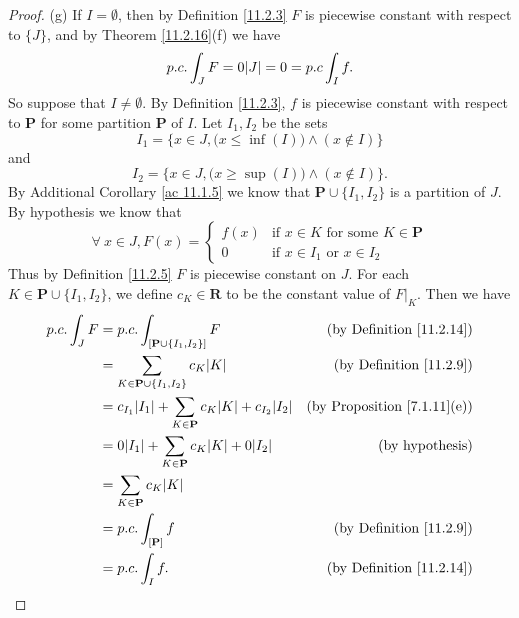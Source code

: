 \begin{proof}{(g)}
    If \(I = \emptyset\), then by Definition \ref{11.2.3} \(F\) is piecewise constant with respect to \(\{J\}\), and by Theorem \ref{11.2.16}(f) we have
    \[
        p.c. \int_J F = 0 \abs*{J} = 0 = p.c \int_I f.
    \]
    So suppose that \(I \neq \emptyset\).
    By Definition \ref{11.2.3}, \(f\) is piecewise constant with respect to \(\mathbf{P}\) for some partition \(\mathbf{P}\) of \(I\).
    Let \(I_1, I_2\) be the sets
    \[
        I_1 = \Big\{x \in J, \big(x \leq \inf(I)\big) \land (x \notin I)\Big\}
    \]
    and
    \[
        I_2 = \Big\{x \in J, \big(x \geq \sup(I)\big) \land (x \notin I)\Big\}.
    \]
    By Additional Corollary \ref{ac 11.1.5} we know that \(\mathbf{P} \cup \{I_1, I_2\}\) is a partition of \(J\).
    By hypothesis we know that
    \[
        \forall\ x \in J, F(x) = \begin{cases}
            f(x) & \text{if } x \in K \text{ for some } K \in \mathbf{P} \\
            0    & \text{if } x \in I_1 \text{ or } x \in I_2
        \end{cases}
    \]
    Thus by Definition \ref{11.2.5} \(F\) is piecewise constant on \(J\).
    For each \(K \in \mathbf{P} \cup \{I_1, I_2\}\), we define \(c_K \in \mathbf{R}\) to be the constant value of \(F|_K\).
    Then we have
    \begin{align*}
        p.c. \int_J F & = p.c. \int_{[\mathbf{P} \cup \{I_1, I_2\}]} F                                   & \text{(by Definition \ref{11.2.14})}    \\
                      & = \sum_{K \in \mathbf{P} \cup \{I_1, I_2\}} c_K \abs*{K}                         & \text{(by Definition \ref{11.2.9})}     \\
                      & = c_{I_1} \abs*{I_1} + \sum_{K \in \mathbf{P}} c_K \abs*{K} + c_{I_2} \abs*{I_2} & \text{(by Proposition \ref{7.1.11}(e))} \\
                      & = 0 \abs*{I_1} + \sum_{K \in \mathbf{P}} c_K \abs*{K} + 0 \abs*{I_2}             & \text{(by hypothesis)}                  \\
                      & = \sum_{K \in \mathbf{P}} c_K \abs*{K}                                                                                     \\
                      & = p.c. \int_{[\mathbf{P}]} f                                                     & \text{(by Definition \ref{11.2.9})}     \\
                      & = p.c. \int_I f.                                                                 & \text{(by Definition \ref{11.2.14})}
    \end{align*}
\end{proof}

